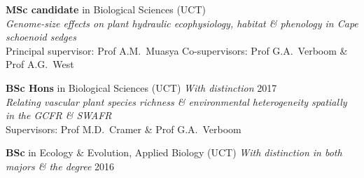 \begin{hangparas}{2em}{1}

\textbf{MSc candidate} in Biological Sciences {\small (UCT)}              \\
\hspace{2em} \textit{Genome-size effects on plant
  hydraulic ecophysiology, habitat \& phenology in
  Cape schoenoid sedges}                                                  \\
\hspace{2em} Principal supervisor: Prof A.M.~Muasya
  Co-supervisors:
  Prof G.A.~Verboom \&
  Prof A.G.~West

\textbf{BSc Hons} in Biological Sciences {\small
  (UCT) \textit{With distinction}}                   \hfill {\small 2017} \\
\hspace{2em} \textit{Relating vascular plant species
  richness \& environmental heterogeneity spatially
  in the GCFR \& SWAFR}                                                   \\
\hspace{2em} Supervisors:
  Prof M.D.~Cramer \&
  Prof G.A.~Verboom

\textbf{BSc} in Ecology \& Evolution, Applied
  Biology {\small (UCT) \textit{With distinction in
  both majors \& the degree}}                        \hfill {\small 2016}

\end{hangparas}
